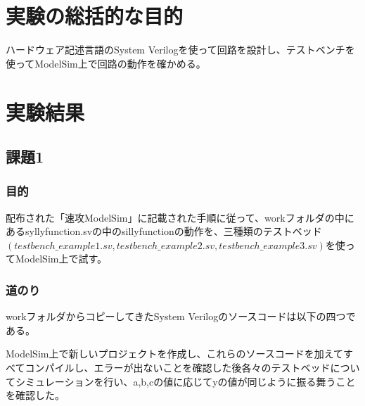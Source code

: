 \documentclass[a4paper]{jarticle}
\begin{document}
\section{実験の総括的な目的}
ハードウェア記述言語のSystem Verilogを使って回路を設計し、テストベンチを使ってModelSim上で回路の動作を確かめる。
\section{実験結果}
\subsection{課題1}
\subsubsection{目的}
配布された「速攻ModelSim」に記載された手順に従って、workフォルダの中にあるsyllyfunction.svの中のsillyfunctionの動作を、三種類のテストベッド$(testbench\_example1.sv,testbench\_example2.sv,testbench\_example3.sv)$を使ってModelSim上で試す。
\subsubsection{道のり}
workフォルダからコピーしてきたSystem Verilogのソースコードは以下の四つである。




ModelSim上で新しいプロジェクトを作成し、これらのソースコードを加えてすべてコンパイルし、エラーが出ないことを確認した後各々のテストベッドについてシミュレーションを行い、a,b,cの値に応じてyの値が同じように振る舞うことを確認した。
\end{document}
